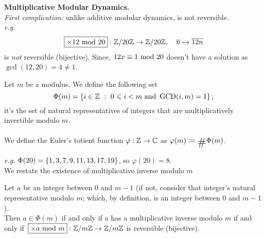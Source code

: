 \vspace*{1em}

{\bf Multiplicative Modular Dynamics.}\\[0.2em]
\emph{First complication:} unlike additive modular dynamics,  is not reversible.\\[0.3em]
\emph{e.g.} \[\fbox{$\times 12 \text{ mod }{20}$}:\mathbb Z/20\mathbb Z \to \mathbb Z/20\mathbb Z,\quad \overline{n} \mapsto \overline{12n}\] is \emph{not} reversible (bijective). Since, $12x\equiv 1 \text{ mod }{20}$ doesn't have a solution as $\gcd(12,20) = 4 \neq 1$.

\vspace*{1em}

\begin{definition}
Let $m$ be a modulus. We define the following set
\[\Phi(m) = \left\{i \in \mathbb Z\ :\ 0\leqslant i < m \text{ and }\operatorname{GCD}(i,m) = 1\right\};\]
it's the set of natural representatives of integers that are multiplicatively invertible modulo $m$.\\
\\
We define the Euler's totient function $\varphi:\mathbb Z \to \mathbb C$ as $\varphi(m) \coloneqq \card\Phi(m)$.
\end{definition}

\vspace*{0.2em}

\emph{e.g.} $\Phi(20) = \left\{1,3,7,9,11,13,17,19\right\}$, so $\varphi(20) = 8$.\\[1em]

We restate the existence of multiplicative inverse modulo $m$
\begin{proposition}
Let $a$ be an integer between $0$ and $m-1$ (if not, consider that integer's natural representative modulo $m$; which, by definition, is an integer between $0$ and $m-1$).\\[0.5em]
Then $a \in \Phi(m)$ if and only if $a$ has a multiplicative inverse modulo $m$ if and only if\ $\fbox{$\times a\text{ mod }{m}$}:\mathbb Z/m\mathbb Z \to \mathbb Z/m\mathbb Z$ is reversible (bijective).
\end{proposition}

\vspace*{1em}

